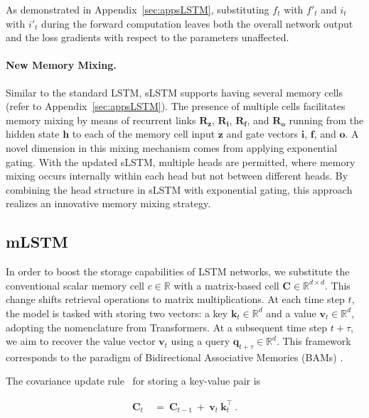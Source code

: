 As demonstrated in Appendix~\ref{sec:appsLSTM}, substituting $f_t$ with $f'_t$ and $i_t$ with $i'_t$ during the forward computation leaves both the overall network output and the loss gradients with respect to the parameters unaffected.

\paragraph{New Memory Mixing.} Similar to the standard LSTM, sLSTM supports having several memory cells (refer to Appendix~\ref{sec:appsLSTM}). The presence of multiple cells facilitates memory mixing by means of recurrent links $\mathbf{R}_{\mathbf{z}}$, $\mathbf{R}_{\mathbf{i}}$, $\mathbf{R}_{\mathbf{f}}$, and $\mathbf{R}_{\mathbf{o}}$ running from the hidden state $\mathbf{h}$ to each of the memory cell input $\mathbf{z}$ and gate vectors $\mathbf{i}$, $\mathbf{f}$, and $\mathbf{o}$. A novel dimension in this mixing mechanism comes from applying exponential gating. With the updated sLSTM, multiple heads are permitted, where memory mixing occurs internally within each head but not between different heads. By combining the head structure in sLSTM with exponential gating, this approach realizes an innovative memory mixing strategy.

\subsection{mLSTM}
\label{sec:mLSTM}

In order to boost the storage capabilities of LSTM networks, we substitute the conventional scalar memory cell $c \in \mathbb{R}$ with a matrix-based cell $\mathbf{C} \in \mathbb{R}^{d \times d}$. This change shifts retrieval operations to matrix multiplications. At each time step $t$, the model is tasked with storing two vectors: a key $\mathbf{k}_t \in \mathbb{R}^d$ and a value $\mathbf{v}_t \in \mathbb{R}^d$, adopting the nomenclature from Transformers. At a subsequent time step $t + \tau$, we aim to recover the value vector $\mathbf{v}_t$ using a query $\mathbf{q}_{t+\tau} \in \mathbb{R}^d$. This framework corresponds to the paradigm of Bidirectional Associative Memories (BAMs) \citep{Kohonen:72,Anderson:72,Nakano:72,Anderson:77}.

The covariance update rule~\citep{Sejnowski:77,Dayan:91} for storing a key-value pair is

\begin{align}
\mathbf{C}_t \ &= \ \mathbf{C}_{t-1} \ + \ \mathbf{v}_{t} \ \mathbf{k}_t^\top \ .
\end{align}

